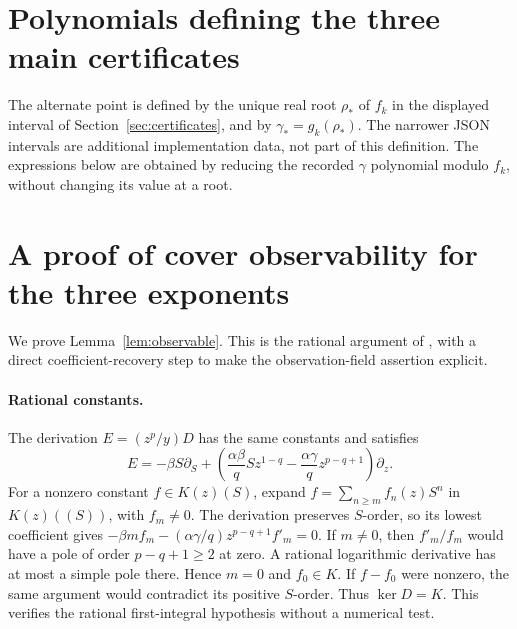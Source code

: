 \documentclass[10pt,a4paper]{article}
\begin{document}
\appendix
\section{Polynomials defining the three main certificates}
\label{app:data}
The alternate point is defined by the unique real root $\rho_*$ of
$f_k$ in the displayed interval of Section~\ref{sec:certificates},
and by $\gamma_*=g_k(\rho_*)$. The narrower JSON intervals are
additional implementation data, not part of this definition.
The expressions below are obtained by reducing the recorded
$\gamma$ polynomial modulo $f_k$, without changing its value at a root.
\CertificatePolynomials

\section{A proof of cover observability for the three exponents}
\label{app:observable}
We prove Lemma~\ref{lem:observable}. This is the rational argument of
\cite[Sections 2--5]{Companion}, with a direct coefficient-recovery
step to make the observation-field assertion explicit.

\paragraph{Rational constants.}
The derivation $E=(z^p/y)D$ has the same constants and satisfies
\[
E=-\beta S\partial_S+
 \left(\frac{\alpha\beta}{q}Sz^{1-q}
       -\frac{\alpha\gamma}{q}z^{p-q+1}\right)\partial_z.
\]
For a nonzero constant $f\in K(z)(S)$, expand
$f=\sum_{n\geq m}f_n(z)S^n$ in $K(z)((S))$, with $f_m\ne0$.
The derivation preserves $S$-order, so its lowest coefficient gives
$-\beta m f_m-(\alpha\gamma/q)z^{p-q+1}f'_m=0$.
If $m\ne0$, then $f'_m/f_m$ would have a pole of order
$p-q+1\geq2$ at zero. A rational logarithmic derivative has at
most a simple pole there. Hence $m=0$ and $f_0\in K$.
If $f-f_0$ were nonzero, the same argument would contradict its
positive $S$-order. Thus $\ker D=K$. This verifies the rational
first-integral hypothesis without a numerical test.
\end{document}
